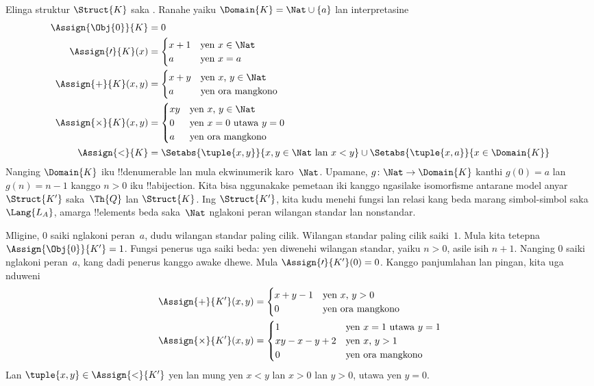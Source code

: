 \documentclass[../../../include/open-logic-section]{subfiles}
\begin{document}
\begin{ex}
Elinga struktur
$\Struct{K}$
saka
.
Ranahe yaiku
$\Domain{K} = \Nat
\cup \{a\}$
lan interpretasine
\begin{align*}
  \Assign{\Obj{0}}{K} & = 0\\
  \Assign{\prime}{K}(x) & =
  \begin{cases}
    x+1 & \text{yen $x\in \Nat$}\\
    a & \text{yen $x = a$}
  \end{cases}\\
  \Assign{+}{K}(x, y) & =
  \begin{cases}
    x+y & \text{yen $x$, $y \in\Nat$}\\
    a & \text{yen ora mangkono}
  \end{cases}\\
  \Assign{\times}{K}(x, y) & =
  \begin{cases}
    xy & \text{yen $x$, $y \in\Nat$}\\
    0 & \text{yen $x=0$ utawa $y=0$}\\
    a & \text{yen ora mangkono}\\
  \end{cases}\\
  \Assign{<}{K} & =
  \Setabs{\tuple{x,y}}{x, y \in \Nat \text{ lan } x<y} \cup
  \Setabs{\tuple{x,a}}{x \in \Domain{K}}
\end{align*}
Nanging $\Domain{K}$
iku !!{denumerable}
lan mula ekwinumerik
karo~$\Nat$.
Upamane,
$g\colon \Nat \to \Domain{K}$
kanthi $g(0) =
a$ lan $g(n) = n-1$
kanggo $n>0$
iku !!a{bijection}.
Kita bisa nggunakake
pemetaan iki kanggo
ngasilake isomorfisme
antarane model anyar~$\Struct{K'}$
saka~$\Th{Q}$
lan $\Struct{K}$.
Ing $\Struct{K'}$,
kita kudu menehi fungsi
lan relasi kang beda
marang simbol-simbol
saka~$\Lang{L_A}$,
amarga !!{element}s
beda saka~$\Nat$
nglakoni peran
wilangan standar
lan nonstandar.

Mligine, $0$
saiki nglakoni
peran~$a$,
dudu wilangan standar
paling cilik.
Wilangan standar
paling cilik saiki~$1$.
Mula kita tetepna
$\Assign{\Obj{0}}{K'} = 1$.
Fungsi penerus
uga saiki beda:
yen diwenehi
wilangan standar,
yaiku $n > 0$,
asile isih
$n+1$.
Nanging $0$
saiki nglakoni
peran~$a$,
kang dadi penerus
kanggo awake dhewe.
Mula
$\Assign{\prime}{K'}(0) = 0$.
Kanggo panjumlahan
lan pingan,
kita uga nduweni
\begin{align*}
\Assign{+}{K'}(x, y) & =
  \begin{cases}
    x+y-1 & \text{yen $x$, $y >0$}\\
    0 & \text{yen ora mangkono}
  \end{cases}\\
  \Assign{\times}{K'}(x, y) & =
  \begin{cases}
    1 & \text{yen $x = 1$ utawa $y = 1$}\\
    xy - x - y + 2 & \text{yen $x$, $y > 1$}\\
    0 & \text{yen ora mangkono}\\
  \end{cases}
\end{align*}
Lan
$\tuple{x, y} \in \Assign{<}{K'}$
yen lan mung yen
$x < y$
lan $x > 0$
lan $y > 0$,
utawa yen
$y = 0$.


\end{ex}
\end{document}
